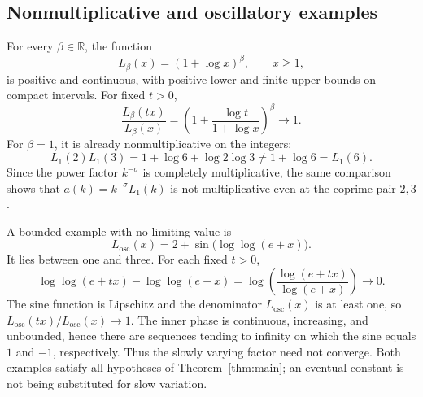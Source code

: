 \subsection{Nonmultiplicative and oscillatory examples}

For every $\beta\in\mathbb R$, the function
\begin{equation}
 L_\beta(x)=(1+\log x)^\beta,\qquad x\ge1,
 \label{eq:log-example}
\end{equation}
is positive and continuous, with positive lower and finite upper
bounds on compact intervals. For fixed $t>0$,
\[
 \frac{L_\beta(tx)}{L_\beta(x)}
 =\left(1+\frac{\log t}{1+\log x}\right)^\beta
 \longrightarrow1.
\]
For $\beta=1$, it is already nonmultiplicative on the integers:
\[
 L_1(2)L_1(3)
 =1+\log6+\log2\log3\ne1+\log6=L_1(6).
\]
Since the power factor $k^{-\sigma}$ is completely multiplicative,
the same comparison shows that $a(k)=k^{-\sigma}L_1(k)$ is not
multiplicative even at the coprime pair $2,3$.

A bounded example with no limiting value is
\begin{equation}
 L_{\mathrm{osc}}(x)=2+\sin\bigl(\log\log(e+x)\bigr).
 \label{eq:oscillatory-example}
\end{equation}
It lies between one and three. For each fixed $t>0$,
\[
 \log\log(e+tx)-\log\log(e+x)
 =\log\left(\frac{\log(e+tx)}{\log(e+x)}\right)
 \longrightarrow0.
\]
The sine function is Lipschitz and the denominator
$L_{\mathrm{osc}}(x)$ is at least one, so
$L_{\mathrm{osc}}(tx)/L_{\mathrm{osc}}(x)\to1$.
The inner phase is continuous, increasing, and unbounded, hence
there are sequences tending to infinity on which the sine equals
$1$ and $-1$, respectively. Thus the slowly varying factor need
not converge. Both examples satisfy all hypotheses of
Theorem~\ref{thm:main}; an eventual constant is not being substituted
for slow variation.
